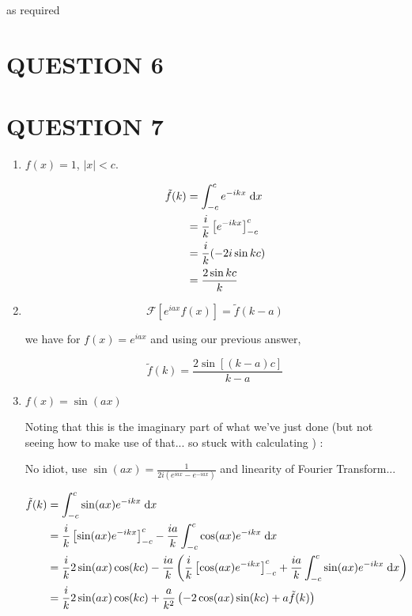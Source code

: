 \documentclass[a4paper]{article}
\begin{document}
as required





\section{QUESTION 6}
\section{QUESTION 7}

\begin{enumerate}
	\item $ f(x) = 1 $, $ | x | < c $.
	
	\begin{align*}
	\tilde{f}(k)  & = \int_{-c}^{c} e^{-ikx} \; \mathrm{d} x   \\
	& = \frac{i}{k} \left[    e^{-ikx}  \right]_{-c}^{c} \\
	& =  \frac{i}{k}(- 2 i \sin k c) \\
	& = \frac{2 \sin kc}{k}
	\end{align*}
	
	\item \[ \mathcal{F}[ e^{iax}f(x) ] = \tilde{f}(k-a) \]
	
	we have for $ f(x) = e^{iax} $ and using our previous answer,
	
	\[ \tilde{f}(k) = \frac{2\sin[(k-a)c]}{k-a} \]
	
	\item $ f(x) = \sin (ax) $
	
	Noting that this is the imaginary part of what we've just done (but not seeing how to make use of that... so stuck with calculating ) :
	
	No idiot, use $ \sin(ax) = \frac{1}{2i (e^{iax} - e^{-iax})} $ and linearity of Fourier Transform...
	
	\begin{align*}
	\tilde{f}(k)  & = \int_{-c}^{c} \sin(ax) e^{-ikx} \; \mathrm{d} x   \\
	& = \frac{i}{k} \left[ \sin(ax)e^{-ikx}  \right]_{-c}^{c} - \frac{ia}{k} \int_{-c}^{c} \cos(ax)e^{-ikx} \; \mathrm{d} x  \\
	& = \frac{i}{k} 2\sin(ax)\cos(kc) - \frac{ia}{k} \left(   \frac{i}{k} \left[ \cos(ax)e^{-ikx}  \right]_{-c}^{c} + \frac{ia}{k} \int_{-c}^{c} \sin(ax)e^{-ikx} \; \mathrm{d} x \right) \\
	& = \frac{i}{k} 2\sin(ax)\cos(kc) + \frac{a}{k^{2}} \left(  -2\cos(ax)\sin(kc) + a \tilde{f}(k) \right) 
	\end{align*}
	

\end{enumerate}
\end{document}
